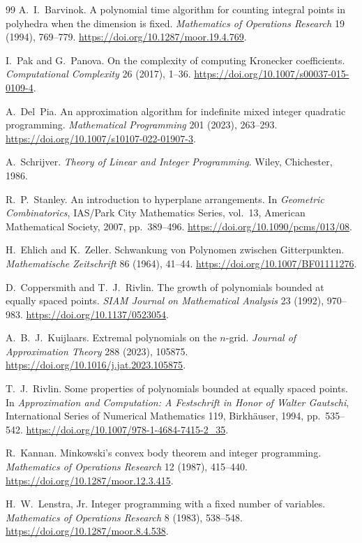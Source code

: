\documentclass[final,5p,times,twocolumn]{elsarticle}
\theoremstyle{definition}\newtheorem{definition}{Definition}[section]
\theoremstyle{remark}\newtheorem{remark}[theorem]{Remark}
\begin{document}
\begin{thebibliography}{99}
 A.~I.~Barvinok.
A polynomial time algorithm for counting integral points in polyhedra when the dimension is fixed.
\emph{Mathematics of Operations Research} 19 (1994), 769--779.
\url{https://doi.org/10.1287/moor.19.4.769}.

 I.~Pak and G.~Panova.
On the complexity of computing Kronecker coefficients.
\emph{Computational Complexity} 26 (2017), 1--36.
\url{https://doi.org/10.1007/s00037-015-0109-4}.

 A.~Del~Pia.
An approximation algorithm for indefinite mixed integer quadratic programming.
\emph{Mathematical Programming} 201 (2023), 263--293.
\url{https://doi.org/10.1007/s10107-022-01907-3}.

 A.~Schrijver.
\emph{Theory of Linear and Integer Programming}. Wiley, Chichester, 1986.

 R.~P.~Stanley.
An introduction to hyperplane arrangements.
In \emph{Geometric Combinatorics}, IAS/Park City Mathematics Series, vol.~13,
American Mathematical Society, 2007, pp.~389--496.
\url{https://doi.org/10.1090/pcms/013/08}.

 H.~Ehlich and K.~Zeller.
Schwankung von Polynomen zwischen Gitterpunkten.
\emph{Mathematische Zeitschrift} 86 (1964), 41--44.
\url{https://doi.org/10.1007/BF01111276}.

 D.~Coppersmith and T.~J.~Rivlin.
The growth of polynomials bounded at equally spaced points.
\emph{SIAM Journal on Mathematical Analysis} 23 (1992), 970--983.
\url{https://doi.org/10.1137/0523054}.

 A.~B.~J.~Kuijlaars.
Extremal polynomials on the $n$-grid.
\emph{Journal of Approximation Theory} 288 (2023), 105875.
\url{https://doi.org/10.1016/j.jat.2023.105875}.

 T.~J.~Rivlin.
Some properties of polynomials bounded at equally spaced points.
In \emph{Approximation and Computation: A Festschrift in Honor of Walter Gautschi},
International Series of Numerical Mathematics 119, Birkh\"auser, 1994, pp.~535--542.
\url{https://doi.org/10.1007/978-1-4684-7415-2_35}.

 R.~Kannan.
Minkowski's convex body theorem and integer programming.
\emph{Mathematics of Operations Research} 12 (1987), 415--440.
\url{https://doi.org/10.1287/moor.12.3.415}.

 H.~W.~Lenstra, Jr.
Integer programming with a fixed number of variables.
\emph{Mathematics of Operations Research} 8 (1983), 538--548.
\url{https://doi.org/10.1287/moor.8.4.538}.


\end{thebibliography}
\end{document}
